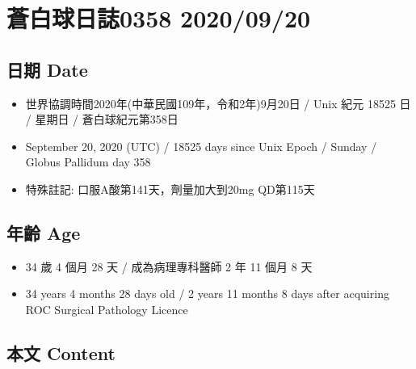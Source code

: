 \documentclass[a5paper, 11pt
]{book}
\providecommand{\tightlist}{%
  \setlength{\itemsep}{0pt}\setlength{\parskip}{0pt}}
\begin{document}
\hypertarget{ux84bcux767dux7403ux65e5ux8a8c0358-20200920}{%
\section{蒼白球日誌0358
2020/09/20}\label{ux84bcux767dux7403ux65e5ux8a8c0358-20200920}}

\hypertarget{ux65e5ux671f-date-19}{%
\subsection{日期 Date}\label{ux65e5ux671f-date-19}}

\begin{itemize}
\tightlist
\item
  世界協調時間2020年(中華民國109年，令和2年)9月20日 / Unix 紀元 18525 日
  / 星期日 / 蒼白球紀元第358日
\item
  September 20, 2020 (UTC) / 18525 days since Unix Epoch / Sunday /
  Globus Pallidum day 358
\item
  特殊註記: 口服A酸第141天，劑量加大到20mg QD第115天
\end{itemize}

\hypertarget{ux5e74ux9f61-age-19}{%
\subsection{年齡 Age}\label{ux5e74ux9f61-age-19}}

\begin{itemize}
\tightlist
\item
  34 歲 4 個月 28 天 / 成為病理專科醫師 2 年 11 個月 8 天
\item
  34 years 4 months 28 days old / 2 years 11 months 8 days after
  acquiring ROC Surgical Pathology Licence
\end{itemize}

\hypertarget{ux672cux6587-content-19}{%
\subsection{本文 Content}\label{ux672cux6587-content-19}}
\end{document}
